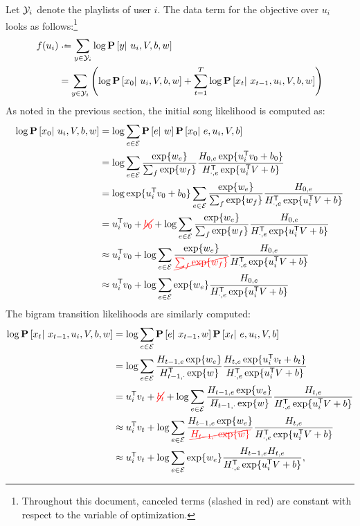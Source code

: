 \documentclass{article}
\newcommand{\ccancel}[2][black]{\color{#1}\cancel{#2}\normalcolor}
\def\E{\ensuremath{\mathcal{E}}}
\begin{document}
Let $\mathcal{Y}_i$ denote the playlists of user $i$. The data term for the objective over $u_i$ looks as follows:\footnote{Throughout this document, canceled terms (slashed in red) are 
constant with respect to the variable of optimization.}
\begin{align}
f(u_i) &\defeq \sum_{y \in \Y_i} \log\P\left[y\given u_i, V, b, w\right]\notag\\
&= \sum_{y \in \Y_i}\left( \log \P\left[x_0 \given u_i, V, b, w \right] + \sum_{t=1}^T \log \P\left[x_t \given x_{t-1}, u_i, V, b, w \right] \right)\label{eq:ustep:obj}
\end{align}
As noted in the previous section, the initial song likelihood is computed as:
\begin{align}
\log\P\left[x_0 \given u_i, V, b, w\right] &= \log\sum_{e\in \E} \P\left[e\given w\right]\P\left[x_0 \given e, u_i, V, b \right] \notag\\
&= \log\sum_{e\in \E} \frac{\exp\{ w_e\}}{\sum_f \exp\{w_f\}} \frac{H_{0, e} \exp\{u_i\trans v_0 + b_0 \} }{H_{\cdot, e}\trans \exp\{u_i\trans V + b \} }\notag\\
&= \log \exp\{u_i\trans v_0 + b_0 \} \sum_{e \in \E} \frac{\exp\{ w_e \}}{\sum_f \exp\{w_f\}}\frac{ H_{0, e} }{H_{\cdot, e}\trans \exp\{u_i\trans V + b \} }\notag\\
&= u_i\trans v_0 + \ccancel[red]{b_0} + \log \sum_{e\in \E}\frac{\exp\{w_e\}}{\sum_f \exp\{w_f\}}\frac{ H_{0, e}}{H_{\cdot, e}\trans \exp\{u_i\trans V + b \}}\notag\\
&\approx u_i\trans v_0 + \log \sum_{e\in \E}\frac{\exp\{w_e\}}{\ccancel[red]{\sum_f \exp\{w_f\}}}\frac{ H_{0, e}}{H_{\cdot, e}\trans \exp\{u_i\trans V + b \}}\notag\\%
&\approx u_i\trans v_0 + \log \sum_{e\in \E}\exp\{w_e\}\frac{ H_{0, e}}{H_{\cdot, e}\trans \exp\{u_i\trans V + b \}}\label{eq:ustep:initial}
\end{align}
The bigram transition likelihoods are similarly computed:
\begin{align}
\log\P\left[x_t \given x_{t-1}, u_i, V, b, w\right] &= \log\sum_{e\in \E} \P\left[e \given x_{t-1}, w \right]\P\left[x_t \given e, u_i, V, b \right]\notag\\
&= \log\sum_{e\in \E} \frac{H_{t-1,e} \exp\{w_e\} }{H_{t-1,\cdot}\trans \exp\{w\}} \frac{H_{t,e} \exp\{u_i\trans v_t + b_t \} }{H_{\cdot,e}\trans \exp\{u_i\trans V + b \} }\notag\\
&= u_i\trans v_t + \ccancel[red]{b_t} + \log\sum_{e\in \E} \frac{H_{t-1,e}\exp\{w_e\} }{H_{t-1,\cdot}\exp\{w\}}\frac{H_{t, e}}{H_{\cdot,e}\trans \exp\{u_i\trans V + b \} }\notag\\
&\approx u_i\trans v_t + \log\sum_{e\in \E} \frac{H_{t-1,e} \exp\{w_e\}}{\ccancel[red]{H_{t-1,\cdot} \exp\{w\} }}\frac{ H_{t,e} }{H_{\cdot,e}\trans \exp\{u_i\trans V + b \} }\notag\\
&\approx u_i\trans v_t + \log\sum_{e\in \E} \exp\{w_e\} \frac{H_{t-1,e} H_{t,e} }{H_{\cdot,e}\trans \exp\{u_i\trans V + b \} },\label{eq:ustep:bigram}
\end{align}
\end{document}
